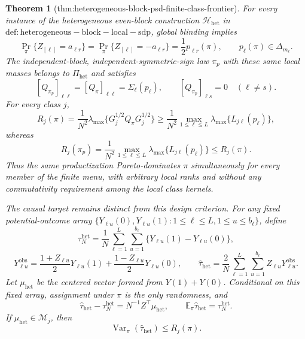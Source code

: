 \documentclass{article}
\newtheorem{theorem}{Theorem}
\begin{document}
\begin{theorem}[thm:heterogeneous-block-psd-finite-class-frontier]\label{thm:heterogeneous-block-psd-finite-class-frontier}
For every instance of the heterogeneous even-block construction \(\mathcal H_{\mathrm{het}}\) in \(\mathrm{def:heterogeneous-block-local-sdp}\), global blinding implies
\[
\Pr_\pi\{Z_{[\ell]}=a_{\ell r}\}
=\Pr_\pi\{Z_{[\ell]}=-a_{\ell r}\}
=\frac12p_{\ell r}(\pi),
\qquad
p_\ell(\pi)\in\Delta_{m_\ell}.
\]
The independent-block, independent-symmetric-sign law \(\pi_p\) with these same local masses belongs to \(\Pi_{\mathrm{het}}\) and satisfies
\[
[Q_{\pi_p}]_{\ell\ell}=[Q_\pi]_{\ell\ell}=\Sigma_\ell(p_\ell),
\qquad
[Q_{\pi_p}]_{\ell s}=0\quad(\ell\ne s).
\]
For every class \(j\),
\[
R_j(\pi)
=\frac1{N^2}\lambda_{\max}\{G_j^{1/2}Q_\pi G_j^{1/2}\}
\ge\frac1{N^2}\max_{1\le\ell\le L}
\lambda_{\max}\{L_{j\ell}(p_\ell)\},
\]
whereas
\[
R_j(\pi_p)
=\frac1{N^2}\max_{1\le\ell\le L}
\lambda_{\max}\{L_{j\ell}(p_\ell)\}
\le R_j(\pi).
\]
Thus the same productization Pareto-dominates \(\pi\) simultaneously for every member of the finite menu, with arbitrary local ranks and without any commutativity requirement among the local class kernels.

The causal target remains distinct from this design criterion.  For any fixed potential-outcome array \(\{Y_{\ell u}(0),Y_{\ell u}(1):1\le\ell\le L,1\le u\le b_\ell\}\), define
\[
\tau_N^{\mathrm{het}}
=\frac1N\sum_{\ell=1}^L\sum_{u=1}^{b_\ell}
\{Y_{\ell u}(1)-Y_{\ell u}(0)\},
\]
\[
Y_{\ell u}^{\mathrm{obs}}
=\frac{1+Z_{\ell u}}2Y_{\ell u}(1)
+\frac{1-Z_{\ell u}}2Y_{\ell u}(0),
\qquad
\widehat\tau_{\mathrm{het}}
=\frac2N\sum_{\ell=1}^L\sum_{u=1}^{b_\ell}Z_{\ell u}Y_{\ell u}^{\mathrm{obs}}.
\]
Let \(\mu_{\mathrm{het}}\) be the centered vector formed from \(Y(1)+Y(0)\).  Conditional on this fixed array, assignment under \(\pi\) is the only randomness, and
\[
\widehat\tau_{\mathrm{het}}-\tau_N^{\mathrm{het}}
=N^{-1}Z^\top\mu_{\mathrm{het}},
\qquad
\mathbb E_\pi\widehat\tau_{\mathrm{het}}=\tau_N^{\mathrm{het}}.
\]
If \(\mu_{\mathrm{het}}\in\mathcal M_j\), then
\[
\operatorname{Var}_\pi(\widehat\tau_{\mathrm{het}})
\le R_j(\pi).
\]


\end{theorem}
\end{document}
